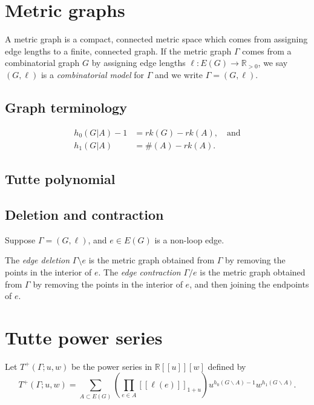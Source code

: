 \documentclass{amsart}
\theoremstyle{definition}
\newcommand{\RR}{\mathbb{R}}
\newcommand{\RRpos}{\RR_{>0}}
\newcommand{\fanalog}[2]{[\![#2]\!]_{#1}}
\begin{document}
\section{Metric graphs}

A metric graph is a compact, connected metric space which comes from 
assigning edge lengths to a finite, connected graph.
If the metric graph $\Gamma$ comes from a combinatorial graph $G$ by 
assigning edge lengths $\ell : E(G) \to \RRpos$,
we say $(G,\ell)$ is a {\em combinatorial model} for $\Gamma$
and we write $\Gamma = (G,\ell)$.

\subsection{Graph terminology}
\begin{align*}
h_0(G| A) - 1 &= rk(G) - rk(A), \quad\text{and}\\
h_1(G| A) &= \#(A) - rk(A) .
\end{align*}


\subsection{Tutte polynomial}

\subsection{Deletion and contraction}

Suppose $\Gamma = (G,\ell)$, and $e \in E(G)$ is a non-loop edge.

The {\em edge deletion} $\Gamma \setminus e$ is the metric graph obtained from $\Gamma$ by removing the points in the interior of $e$.
The {\em edge contraction} $\Gamma / e$ is the metric graph obtained from $\Gamma$ by removing the points in the interior of $e$, and then joining the endpoints of $e$.


\section{Tutte power series}

Let $T^+(\Gamma; u,w)$ be the power series in $\RR[\![u]\!][w]$
defined by
\begin{equation}
	T^+(\Gamma; u,w) = \sum_{A \subset E(G)} \left( \prod_{e \in A} \fanalog{1 + u}{\ell(e)} \right)
	u^{h_0(G\backslash A) - 1}w^{h_1(G\backslash A)} .
\end{equation}
\end{document}
